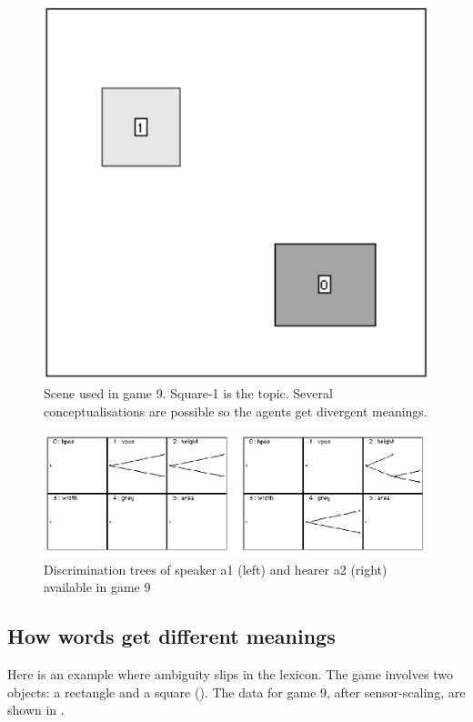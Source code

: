 \begin{figure}[htbp]
  \centerline{\includegraphics[width=.40\textwidth]{chap6/figs/scene-game9.pdf}}
\caption{\label{game9}Scene used
in game 9. Square-1 is the topic. Several conceptualisations are 
possible so the agents get divergent meanings.}
\end{figure}


\begin{figure}[htbp]
  \centerline{\includegraphics[width=\textwidth]{chap6/figs/discri-game9.pdf}}
\caption{\label{discri-game9}Discrimination trees
of speaker a1 (left) and hearer a2 (right) available 
in game 9}
\end{figure}

\subsection{How words get different meanings}

Here is an example where ambiguity slips in 
the lexicon. The game involves two 
objects: a rectangle and a square (). 
The data for game 9, after sensor-scaling, are \enlargethispage{1\baselineskip}
shown in .  


